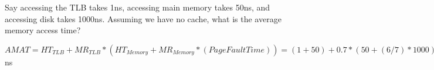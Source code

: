 \begin{blocksection}
\question 
Say accessing the TLB takes 1ns, accessing main memory takes 50ns, and accessing disk takes 1000ns. Assuming we have no cache, what is the average memory access time?

\begin{solution}
$AMAT = HT_{TLB} + MR_{TLB}*(HT_{Memory} + MR_{Memory}*(Page Fault Time)) = (1+50) + 0.7*(50 + (6/7)*1000) = 686$ns
\end{solution}

\end{blocksection}